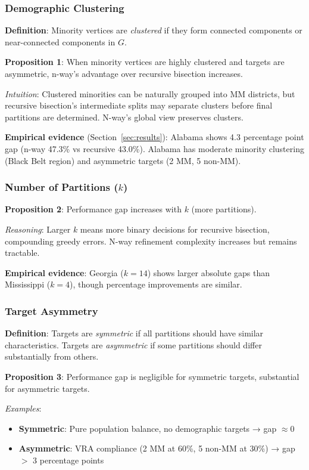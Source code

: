 \subsubsection{Demographic Clustering}

\textbf{Definition}: Minority vertices are \textit{clustered} if they form connected components or near-connected components in $G$.

\textbf{Proposition 1}: When minority vertices are highly clustered and targets are asymmetric, n-way's advantage over recursive bisection increases.

\textit{Intuition}: Clustered minorities can be naturally grouped into MM districts, but recursive bisection's intermediate splits may separate clusters before final partitions are determined. N-way's global view preserves clusters.

\textbf{Empirical evidence} (Section~\ref{sec:results}): Alabama shows 4.3 percentage point gap (n-way 47.3\% vs recursive 43.0\%). Alabama has moderate minority clustering (Black Belt region) and asymmetric targets (2 MM, 5 non-MM).

\subsubsection{Number of Partitions ($k$)}

\textbf{Proposition 2}: Performance gap increases with $k$ (more partitions).

\textit{Reasoning}: Larger $k$ means more binary decisions for recursive bisection, compounding greedy errors. N-way refinement complexity increases but remains tractable.

\textbf{Empirical evidence}: Georgia ($k=14$) shows larger absolute gaps than Mississippi ($k=4$), though percentage improvements are similar.

\subsubsection{Target Asymmetry}

\textbf{Definition}: Targets are \textit{symmetric} if all partitions should have similar characteristics. Targets are \textit{asymmetric} if some partitions should differ substantially from others.

\textbf{Proposition 3}: Performance gap is negligible for symmetric targets, substantial for asymmetric targets.

\textit{Examples}:
\begin{itemize}
\item \textbf{Symmetric}: Pure population balance, no demographic targets → gap $\approx 0$
\item \textbf{Asymmetric}: VRA compliance (2 MM at 60\%, 5 non-MM at 30\%) → gap $>$ 3 percentage points
\end{itemize}

